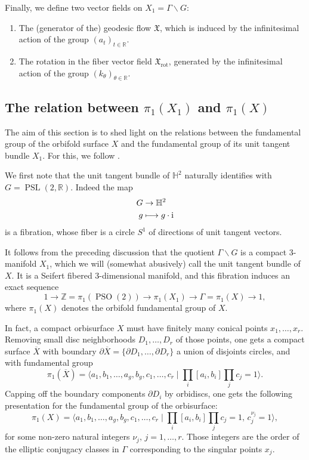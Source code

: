 \documentclass[10pt]{amsart}
\newcommand\mto{\mathchoice{\longmapsto}{\mapsto}{\mapsto}{\mapsto}}
\theoremstyle{plain}
\theoremstyle{definition}
\theoremstyle{remark}
\newcommand{\R}{\mathbb{R}}
\newcommand{\Z}{\mathbb{Z}}
\renewcommand{\H}{\mathbb{H}}
\newcommand{\rot}{\mathrm{rot}}
\DeclareMathOperator{\PSL}{PSL}
\DeclareMathOperator{\PSO}{PSO}
\numberwithin{equation}{section}
\begin{document}
Finally, we define two vector fields on $X_1 = \Gamma \backslash G$:
\begin{enumerate}
\item The (generator of the) geodesic flow $\mathfrak X$, which is induced by the infinitesimal action of the group $(a_t)_{t \in \R}$.
\item The rotation in the fiber vector field $\mathfrak X_\rot$, generated by the infinitesimal action of the group $(k_\theta)_{\theta \in \R}$.
\end{enumerate}
\subsection{The relation between $\pi_1(X_1)$ and $\pi_1(X)$}
\label{subsec:Unit}
The aim of this section is to shed light on the relations between the fundamental group of the orbifold surface $X$ and the fundamental group of its unit tangent bundle $X_1$. For this, we follow \cite[\S 2]{fried1986fuchsian}.

We first note that the unit tangent bundle of $\H^2$ naturally identifies with $G=\PSL(2,\R)$. Indeed the map
\begin{align*}
G &\to \H^2\\
g &\mto g\cdot \textrm i
\end{align*}
is a fibration, whose fiber is a circle $S^1$ of directions of unit tangent vectors.

It follows from the preceding discussion that the quotient $\Gamma \backslash G$ is a compact 3\nobreakdash-manifold $X_1$, which we will (somewhat abusively) call the unit tangent bundle of~$X$. It is a Seifert fibered 3\nobreakdash-dimensional manifold, and this fibration induces an exact sequence
\[
1 \to \Z = \pi_1(\PSO(2)) \to \pi_1(X_1) \to \Gamma= \pi_1(X) \to 1,
\]
where $\pi_1(X)$ denotes the orbifold fundamental group of $X$.

In fact, a compact orbisurface $X$ must have finitely many conical points $x_1, \ldots, x_r$. Removing small disc neighborhoods $D_1, \ldots, D_r$ of those points, one gets a compact surface $\overline X$ with boundary $\partial \overline X=\{\partial D_1, \ldots, \partial D_r\}$ a union of disjoints circles, and with fundamental group
\[\textstyle
\pi_1(\overline X)= \bigl\langle a_1, b_1, \ldots, a_g, b_g, c_1, \ldots, c_r \mid \prod_i[a_i,b_i]\prod_j c_j = 1 \bigr\rangle.
\]
Capping off the boundary components $\partial D_i$ by orbidiscs, one gets the following presentation for the fundamental group of the orbisurface:
\[\textstyle
\pi_1(X)= \bigl\langle a_1, b_1, \ldots, a_g, b_g, c_1, \ldots, c_r \mid \prod_i[a_i,b_i]\prod_j c_j = 1, \, c_j^{\nu_j}=1 \bigr\rangle,
\]
for some non-zero natural integers $\nu_j, \, j= 1, \ldots, r$. Those integers are the order of the elliptic conjugacy classes in $\Gamma$ corresponding to the singular points $x_j$.
\end{document}
